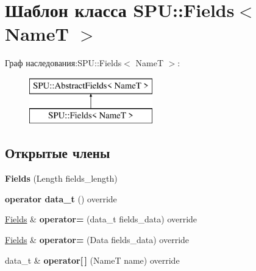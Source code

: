 \hypertarget{class_s_p_u_1_1_fields}{}\section{Шаблон класса S\+PU\+:\+:Fields$<$ NameT $>$}
\label{class_s_p_u_1_1_fields}
Граф наследования\+:S\+PU\+:\+:Fields$<$ NameT $>$\+:\begin{figure}[H]
\begin{center}
\leavevmode
\includegraphics[height=2.000000cm]{class_s_p_u_1_1_fields}
\end{center}
\end{figure}
\subsection*{Открытые члены}
\begin{DoxyCompactItemize}
\item 
\mbox{\label{class_s_p_u_1_1_fields_ae46e793567ed2f98bf3d2e9ce3960e16}} 
{\bfseries Fields} (Length fields\+\_\+length)
\item 
\mbox{\label{class_s_p_u_1_1_fields_ac2b4341d75532e5436232217ebac0116}} 
{\bfseries operator data\+\_\+t} () override
\item 
\mbox{\label{class_s_p_u_1_1_fields_abfb59ae69298a677e4aeaa074b6d6341}} 
\hyperlink{class_s_p_u_1_1_fields}{Fields} \& {\bfseries operator=} (data\+\_\+t fields\+\_\+data) override
\item 
\mbox{\label{class_s_p_u_1_1_fields_a164f89e212b04114d390907dbdf8f3cf}} 
\hyperlink{class_s_p_u_1_1_fields}{Fields} \& {\bfseries operator=} (Data fields\+\_\+data) override
\item 
\mbox{\label{class_s_p_u_1_1_fields_aba5505222d3f0d1befb223f778d3f070}} 
data\+\_\+t \& {\bfseries operator\mbox{[}$\,$\mbox{]}} (NameT name) override
\end{DoxyCompactItemize}
